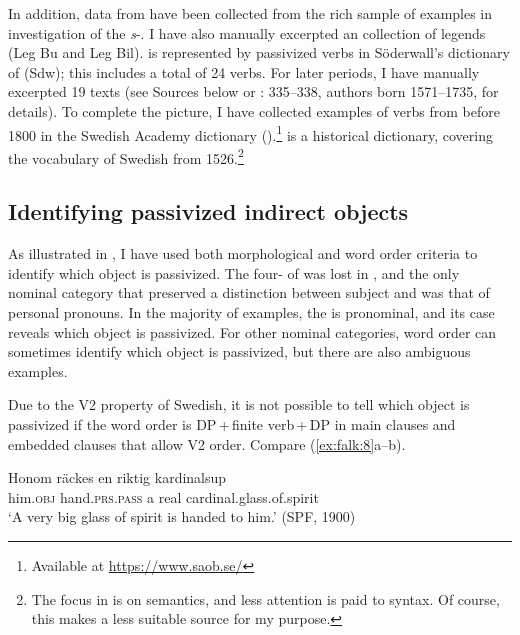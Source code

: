 \documentclass[output=paper]{langscibook}
\begin{document}
In addition, data from  have been collected from the rich sample of examples in  investigation of the \textit{s}{}-. I have also manually excerpted an  collection of legends (Leg Bu and Leg Bil).  is represented by passivized  verbs in Söderwall’s dictionary of  (Sdw); this includes a total of 24 verbs. For later periods, I have manually excerpted 19 texts (see Sources below or \citealt{Falk1993}: 335–338, authors born 1571–1735, for details). To complete the picture, I have collected examples of  verbs from before 1800 in the Swedish Academy dictionary ().\footnote{Available at \url{https://www.saob.se/}}   is a historical dictionary, covering the vocabulary of Swedish from 1526.\footnote{The focus in  is on semantics, and less attention is paid to syntax. Of course, this makes  a less suitable source for my purpose.}


\subsection{Identifying passivized indirect objects}\label{sec:falk:3.2}


As illustrated in , I have used both morphological and word order criteria to identify which object is passivized. The four- of  was lost in , and the only nominal category that preserved a distinction between subject and  was that of personal pronouns. In the majority of examples, the  is pronominal, and its case reveals which object is passivized. For other nominal categories, word order can sometimes identify which object is passivized, but there are also ambiguous examples.


Due to the V2 property of Swedish, it is not possible to tell which object is passivized if the word order is DP\,+\,finite verb\,+\,DP in main clauses and embedded clauses that allow V2 order. Compare (\ref{ex:falk:8}a–b).


\ea%
    \label{ex:falk:8}
\ea \label{ex:falk:8a}
\gll Honom  räckes        en    riktig  kardinalsup\\
      him.\textsc{obj}  hand\textsc{.prs}.\textsc{pass}  a      real   cardinal.glass.of.spirit\\
\glt ‘A very big glass of spirit is handed to him.’ (SPF, 1900)
\end{document}
